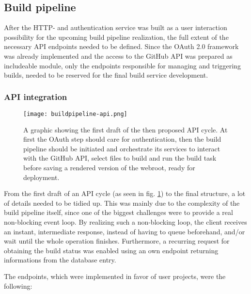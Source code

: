 \subsection{Build pipeline}
\label{sec:structure-buildpipeline}
After the HTTP- and authentication service was built as a user interaction possibility for the upcoming build pipeline realization, the full extent of the necessary API endpoints needed to be defined. Since the OAuth 2.0 framework was already implemented and the access to the GitHub API was prepared as includeable module, only the endpoints responsible for managing and triggering builds, needed to be reserved for the final build service development.

\subsubsection{API integration}

\begin{figure} %
    \centering
    \texttt{[image: buildpipeline-api.png]}
    \caption{A graphic showing the first draft of the then proposed API cycle. At first the OAuth step should care for authentication, then the build pipeline should be initiated and orchestrate its services to interact with the GitHub API, select files to build and run the build task before saving a rendered version of the webroot, ready for deployment.}
    \label{fig:buildpipeline-api}
\end{figure}
%

From the first draft of an API cycle (as seen in fig. \ref{fig:buildpipeline-api}) to the final structure, a lot of details needed to be tidied up. This was mainly due to the complexity of the build pipeline itself, since one of the biggest challenges were to provide a real non-blocking event loop. By realizing such a non-blocking loop, the client receives an instant, intermediate response, instead of having to queue beforehand, and/or wait until the whole operation finishes. Furthermore, a recurring request for obtaining the build status was enabled using an own endpoint returning informations from the database entry.

The endpoints, which were implemented in favor of user projects, were the following:

